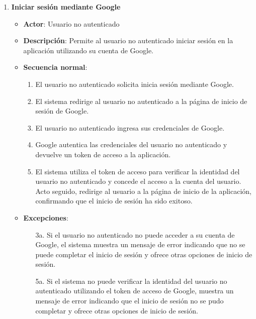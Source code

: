\begin{enumerate}[label=UC-\protect\twodigits{\arabic*}:, align=left, leftmargin=*]
\item \textbf{Iniciar sesión mediante Google}
\begin{itemize}
\item \textbf{Actor}: Usuario no autenticado
\item \textbf{Descripción}: Permite al usuario no autenticado iniciar sesión en la aplicación utilizando su cuenta de Google.
\item \textbf{Secuencia normal}:
\begin{enumerate}[label={\arabic*}:]
\item El usuario no autenticado solicita inicia sesión mediante Google.
\item El sistema redirige al usuario no autenticado a la página de inicio de sesión de Google.
\item El usuario no autenticado ingresa sus credenciales de Google.
\item Google autentica las credenciales del usuario no autenticado y devuelve un token de acceso a la aplicación.
\item El sistema utiliza el token de acceso para verificar la identidad del usuario no autenticado y concede el acceso a la cuenta del usuario. Acto seguido, redirige al usuario a la página de inicio de la aplicación, confirmando que el inicio de sesión ha sido exitoso.
\end{enumerate}
\item \textbf{Excepciones}:
\begin{itemize}
\item[3a.] Si el usuario no autenticado no puede acceder a su cuenta de Google, el sistema muestra un mensaje de error indicando que no se puede completar el inicio de sesión y ofrece otras opciones de inicio de sesión.
\item[5a.] Si el sistema no puede verificar la identidad del usuario no autenticado utilizando el token de acceso de Google, muestra un mensaje de error indicando que el inicio de sesión no se pudo completar y ofrece otras opciones de inicio de sesión.
\end{itemize}
\end{itemize}


\end{enumerate}
